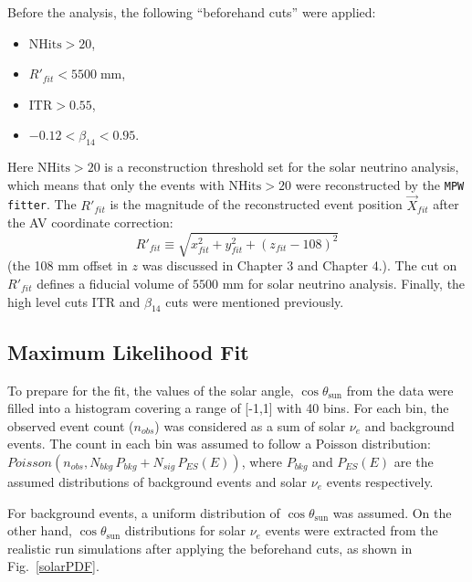 Before the analysis, the following ``beforehand cuts'' were applied: 
\begin{itemize}
    \item $\mathrm{NHits}>20$\;, 
    \item $R'_{fit}<5500 \; \mathrm{mm}$\;,
    \item $\mathrm{ITR}>0.55$\;,
    \item $-0.12<\beta_{14}<0.95$\;. 
\end{itemize}
Here $\mathrm{NHits}>20$ is a reconstruction threshold set for the solar neutrino analysis, which means that only the events with $\mathrm{NHits}>20$ were reconstructed by the \texttt{MPW fitter}. The $R'_{fit}$ is the magnitude of the reconstructed event position $\vec{X}_{fit}$ after the AV coordinate correction:
\begin{equation*}
R'_{fit}\equiv\sqrt{x^2_{fit}+y^2_{fit}+(z_{fit}-108)^2}
\end{equation*}
(the 108 mm offset in $z$ was discussed in Chapter 3 and Chapter 4.). The cut on $R'_{fit}$ defines a fiducial volume of $5500$ mm for solar neutrino analysis. Finally, the high level cuts ITR and $\beta_{14}$ cuts were mentioned previously.

\subsection{Maximum Likelihood Fit}\label{sect:poisson_fit}

To prepare for the fit, the values of the solar angle, $\cos\theta_\mathrm{sun}$ from the data were filled into a histogram covering a range of [-1,1] with 40 bins. For each bin, the observed event count ($n_{obs}$) was considered as a sum of solar $\nu_e$ and background events. The count in each bin was assumed to follow a Poisson distribution: $Poisson(n_{obs}, N_{bkg} \, P_{bkg}+N_{sig} \, P_{ES}(E))$, where $P_{bkg}$ and $P_{ES}(E)$ are the assumed distributions of background events and solar $\nu_e$ events respectively.

For background events, a uniform distribution of $\cos\theta_\mathrm{sun}$ was assumed. On the other hand, $\cos\theta_\mathrm{sun}$ distributions for solar $\nu_e$ events were extracted from the realistic run simulations after applying the beforehand cuts, as shown in Fig.~\ref{solarPDF}. 

